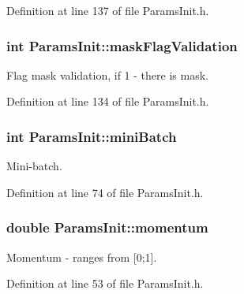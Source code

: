 Definition at line 137 of file Params\+Init.\+h.

\subsubsection[{\texorpdfstring{mask\+Flag\+Validation}{maskFlagValidation}}]{\setlength{\rightskip}{0pt plus 5cm}int Params\+Init\+::mask\+Flag\+Validation}\hypertarget{classParamsInit_add25cddec66c83e2ba79aa31df1ba3a6}{}\label{classParamsInit_add25cddec66c83e2ba79aa31df1ba3a6}


Flag mask validation, if 1 -\/ there is mask. 



Definition at line 134 of file Params\+Init.\+h.

\subsubsection[{\texorpdfstring{mini\+Batch}{miniBatch}}]{\setlength{\rightskip}{0pt plus 5cm}int Params\+Init\+::mini\+Batch}\hypertarget{classParamsInit_a5b75660e32158581daeb48a8b648c19a}{}\label{classParamsInit_a5b75660e32158581daeb48a8b648c19a}


Mini-\/batch. 



Definition at line 74 of file Params\+Init.\+h.

\subsubsection[{\texorpdfstring{momentum}{momentum}}]{\setlength{\rightskip}{0pt plus 5cm}double Params\+Init\+::momentum}\hypertarget{classParamsInit_accff049590c6fb6e86cf2152e8c0a1b5}{}\label{classParamsInit_accff049590c6fb6e86cf2152e8c0a1b5}


Momentum -\/ ranges from \mbox{[}0;1\mbox{]}. 



Definition at line 53 of file Params\+Init.\+h.

